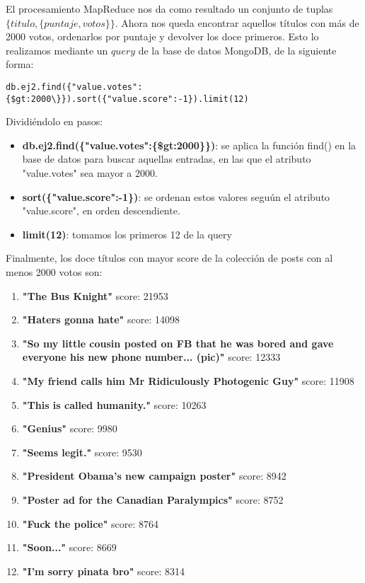 El procesamiento MapReduce nos da como resultado un conjunto de tuplas $\{titulo, \{ puntaje, votos \}\}$. Ahora nos queda encontrar aquellos t\'itulos con m\'as de 2000 votos, ordenarlos por puntaje y devolver los doce primeros. Esto lo realizamos mediante un $query$ de la base de datos MongoDB, de la siguiente forma:

\vspace{2mm}

\begin{lstlisting}
db.ej2.find({"value.votes":{$gt:2000\}}).sort({"value.score":-1}).limit(12)
\end{lstlisting}

Dividi\'endolo en pasos:

\begin{itemize}

\item \textbf{db.ej2.find(\{"value.votes":\{\$gt:2000\}\})}: se aplica la funci\'on find() en la base de datos para buscar aquellas entradas, en las que el atributo "value.votes" sea mayor a 2000.

\item \textbf{sort(\{"value.score":-1\})}: se ordenan estos valores segu\'un el atributo "value.score", en orden descendiente.

\item \textbf{limit(12)}: tomamos los primeros 12 de la query

\end{itemize}

\vspace{2mm}

Finalmente, los doce t\'itulos con mayor score de la colecci\'on de posts con al menos 2000 votos son:

\begin{enumerate}

\item \textbf{"The Bus Knight"} score: 21953
\item \textbf{"Haters gonna hate"} score: 14098
\item  \textbf{"So my little cousin posted on FB that he was bored and gave everyone his new phone number... (pic)"} score: 12333
\item \textbf{"My friend calls him Mr Ridiculously Photogenic Guy"} score: 11908
\item \textbf{"This is called humanity."} score: 10263
\item \textbf{"Genius"} score: 9980
\item \textbf{"Seems legit."} score: 9530
\item \textbf{"President Obama's new campaign poster"} score: 8942
\item\textbf{"Poster ad for the Canadian Paralympics"} score: 8752
\item \textbf{"Fuck the police"} score: 8764
\item \textbf{"Soon..."} score: 8669
\item \textbf{"I'm sorry pinata bro"} score: 8314

\end{enumerate}

